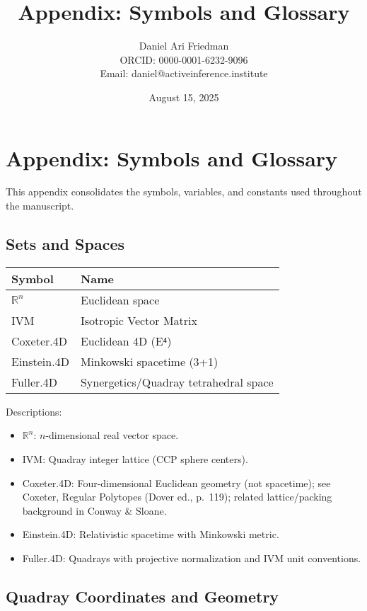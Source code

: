 \documentclass[
  10pt,
]{article}
\title{Appendix: Symbols and Glossary}
\author{Daniel Ari Friedman\\ ORCID: 0000-0001-6232-9096\\ Email: daniel@activeinference.institute}
\date{August 15, 2025}
\providecommand{\tightlist}{%
  \setlength{\itemsep}{0pt}\setlength{\parskip}{0pt}}
\begin{document}
\maketitle

{
\hypersetup{linkcolor=black}
\setcounter{tocdepth}{3}
\tableofcontents
}
\hypertarget{appendix-symbols-and-glossary}{%
\section{Appendix: Symbols and
Glossary}\label{appendix-symbols-and-glossary}}

This appendix consolidates the symbols, variables, and constants used
throughout the manuscript.

\hypertarget{sets-and-spaces}{%
\subsection{Sets and Spaces}\label{sets-and-spaces}}

\begin{longtable}[]{@{}ll@{}}
\toprule
Symbol & Name\tabularnewline
\midrule
\endhead
\(\mathbb{R}^n\) & Euclidean space\tabularnewline
IVM & Isotropic Vector Matrix\tabularnewline
Coxeter.4D & Euclidean 4D (E⁴)\tabularnewline
Einstein.4D & Minkowski spacetime (3+1)\tabularnewline
Fuller.4D & Synergetics/Quadray tetrahedral space\tabularnewline
\bottomrule
\end{longtable}

Descriptions:

\begin{itemize}
\tightlist
\item
  \(\mathbb{R}^n\): \(n\)-dimensional real vector space.
\item
  IVM: Quadray integer lattice (CCP sphere centers).
\item
  Coxeter.4D: Four-dimensional Euclidean geometry (not spacetime); see
  Coxeter, Regular Polytopes (Dover ed., p.~119); related
  lattice/packing background in Conway \& Sloane.
\item
  Einstein.4D: Relativistic spacetime with Minkowski metric.
\item
  Fuller.4D: Quadrays with projective normalization and IVM unit
  conventions.
\end{itemize}

\hypertarget{quadray-coordinates-and-geometry}{%
\subsection{Quadray Coordinates and
Geometry}\label{quadray-coordinates-and-geometry}}
\end{document}
